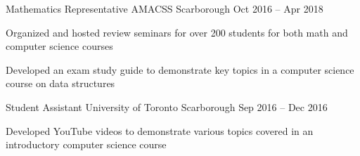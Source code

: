 \begin{cventries}
  \cventry
    {Mathematics Representative}
    {AMACSS}
    {Scarborough}
    {Oct 2016 -- Apr 2018}
    {}
    {
      \begin{cvitems}
        \item {Organized and hosted review seminars for over 200 students for both math and computer science courses}
        \item {Developed an exam study guide to demonstrate key topics in a computer science course on data structures}
      \end{cvitems}
    }
  \cventry
    {Student Assistant}
    {University of Toronto}
    {Scarborough}
    {Sep 2016 -- Dec 2016}
    {}
    {
      \begin{cvitems}
        \item {Developed YouTube videos to demonstrate various topics covered in an introductory computer science course}
      \end{cvitems}
    }
\end{cventries}
